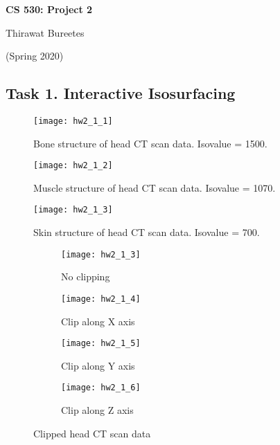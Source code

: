 \documentclass[11pt]{article}
\begin{document}
\begin{center}
\Large{\textbf{CS 530: Project 2}}

Thirawat Bureetes

(Spring 2020)
\end{center}

\subsection*{Task 1. Interactive Isosurfacing}

\begin{figure}[H]
\centering
\texttt{[image: hw2\_1\_1]}
\caption{Bone structure of head CT scan data. Isovalue = 1500.}
\label{fig:hw2_1_1}
\end{figure}

\begin{figure}[H]
\centering
\texttt{[image: hw2\_1\_2]}
\caption{Muscle structure of head CT scan data. Isovalue = 1070.}
\label{fig:hw2_1_2}
\end{figure}

\begin{figure}[H]
\centering
\texttt{[image: hw2\_1\_3]}
\caption{Skin structure of head CT scan data. Isovalue = 700.}
\label{fig:hw2_1_3}
\end{figure}

\begin{figure}[H]
\begin{subfigure}{.5\textwidth}
  \centering
  \texttt{[image: hw2\_1\_3]}
  \caption{No clipping}
  \label{fig:hw2_1_3}
\end{subfigure}
\begin{subfigure}{.5\textwidth}
  \centering
  \texttt{[image: hw2\_1\_4]}
  \caption{Clip along X axis}
  \label{fig:hw2_1_4}
\end{subfigure}

\begin{subfigure}{.5\textwidth}
  \centering
  \texttt{[image: hw2\_1\_5]}
  \caption{Clip along Y axis}
  \label{fig:hw2_1_5}
\end{subfigure}
\begin{subfigure}{.5\textwidth}
  \centering
  \texttt{[image: hw2\_1\_6]}
  \caption{Clip along Z axis}
  \label{fig:hw2_1_6}
\end{subfigure}
\caption{Clipped head CT scan data}
\label{fig:hw2_1_3-6}
\end{figure}
\end{document}
